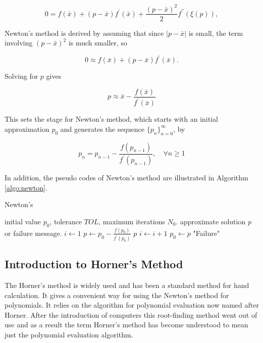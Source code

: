 \documentclass[preprint,12pt]{elsarticle}
\begin{document}
\begin{equation}
    0=f(\bar{x})+(p-\bar{x})f^{'}(\bar{x})+\frac{(p-\bar{x})^2}{2}f^{''}(\xi(p)),
\end{equation}

Newton's method is derived by assuming that since $|p-\bar{x}|$ is small, the term involving $(p-\bar{x})^2$ is much smaller, so

\begin{equation}
    0\approx f(\bar{x})+(p-\bar{x})f^{'}(\bar{x}).
\end{equation}

Solving for $p$ gives 

\begin{equation}
    p\approx \bar{x}-\frac{f(\bar{x})}{f^{'}(\bar{x})}
\end{equation}

This sets the stage for Newton's method, which starts with an initial approximation $p_0$ and generates the sequence $\{p_n\}_{n=0}^{\infty}$, by

\begin{equation}
    p_n=p_{n-1}-\frac{f(p_{n-1})}{f^{'}(p_{n-1})},\quad \forall n\geq 1
\end{equation}

In addition, the pseudo codes of Newton's method are illustrated in Algorithm \ref{algo:newton}.

\begin{algorithm}
    \caption{Newton's}
    \label{algo:newton}
    \begin{algorithmic}[1]
    \Require initial value $p_0$, tolerance $TOL$, maximum iterations $N_0$.
    \Ensure approximate solution $p$ or failure message.
    \State $i\gets 1$
        \State $p\gets p_0-\frac{f(p_0)}{f^{'}(p_0)}$
            \State \Return $p$
        \EndIf
        \State $i\gets i+1$
        \State $p_0\gets p$
    \EndWhile
        \State \Return "Failure"
    \EndIf
    \end{algorithmic}
\end{algorithm}

\subsection{Introduction to Horner's Method}
\label{SS:2.2}

The Horner's method is widely used and has been a standard method for hand calculation. It gives a convenient way for using the Newton's method for polynomials. It relies on the algorithm for polynomial evaluation now named after Horner. After the introduction of computers this root-finding method went out of use and as a result the term Horner's method has become understood to mean just the polynomial evaluation algorithm.
\end{document}

